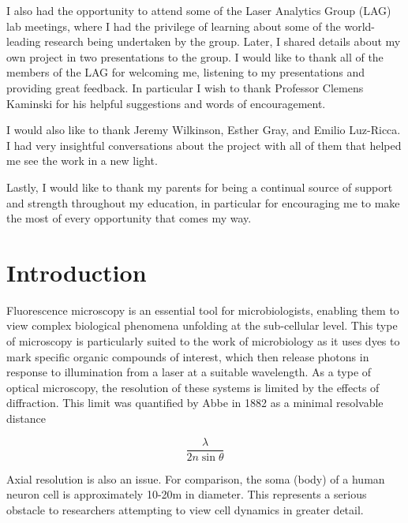 \documentclass[12pt]{article}
\begin{document}
I also had the opportunity to attend some of the Laser Analytics Group (LAG) lab meetings,
where I had the privilege of learning about some of the world-leading research being undertaken by the group.
Later, I shared details about my own project in two presentations to the group.
I would like to thank all of the members of the LAG for welcoming me, listening to my presentations and providing great feedback.
In particular I wish to thank Professor Clemens Kaminski for his helpful suggestions and words of encouragement.

I would also like to thank Jeremy Wilkinson, Esther Gray, and Emilio Luz-Ricca.
I had very insightful conversations about the project with all of them that helped me see the work in a new light.

Lastly, I would like to thank my parents for being a continual source of support and strength throughout my education,
in particular for encouraging me to make the most of every opportunity that comes my way.

\newpage
\begin{abstract}

\end{abstract}

\newpage
\tableofcontents

\newpage
{}
\section{Introduction}

Fluorescence microscopy is an essential tool for microbiologists,
enabling them to view complex biological phenomena unfolding at the sub-cellular level.
This type of microscopy is particularly suited to the work of microbiology as it uses dyes to mark specific organic compounds of interest,
which then release photons in response to illumination from a laser at a suitable wavelength.
As a type of optical microscopy, the resolution of these systems is limited by the effects of diffraction.
This limit was quantified by Abbe in 1882 as a minimal resolvable distance

\[\frac{\lambda}{2n\sin\theta}\]

Axial resolution is also an issue.
For comparison, the soma (body) of a human neuron cell is approximately 10-20\textmu m in diameter.
This represents a serious obstacle to researchers attempting to view cell dynamics in greater detail.
\end{document}
